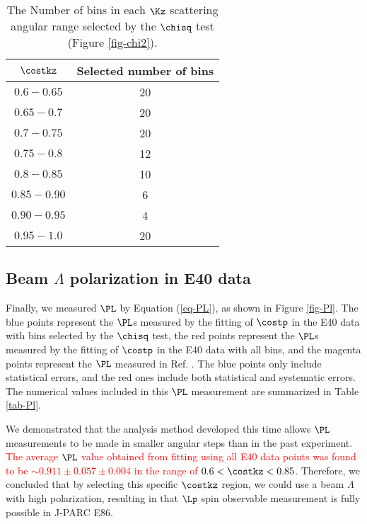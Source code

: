 \begin{table}[!h] 
  \begin{center}
  \caption{The Number of bins in each $\Kz$ scattering angular range selected by the $\chisq$ test (Figure \ref{fig-chi2}).}
  \centering
  \begin{threeparttable}
    \begin{tabular}{cc}
    $\costkz$ & Selected number of bins \\
    \midrule\midrule
    $0.6-0.65$ & 20 \\
    \midrule
    $0.65-0.7$ & 20 \\
    \midrule
    $0.7-0.75$ & 20 \\
    \midrule
    $0.75-0.8$ & 12 \\
    \midrule
    $0.8-0.85$ & 10 \\
    \midrule
    $0.85-0.90$ & 6 \\
    \midrule
    $0.90-0.95$ & 4 \\
    \midrule
    $0.95-1.0$ & 20 \\
    \end{tabular}
  \end{threeparttable}
  \label{tab-selebin}
  \end{center}
\end{table}
  

\clearpage
\subsection{Beam $\Lambda$ polarization in E40 data}

Finally, we measured $\PL$ by Equation (\ref{eq-PL}), as shown in Figure \ref{fig-Pl}. 
The blue points represent the $\PL$s measured by the fitting of $\costp$ in the E40 data with bins selected by the $\chisq$ test, the red points represent the $\PL$s measured by the fitting of $\costp$ in the E40 data with all bins, and the magenta points represent the $\PL$ measured in Ref. \cite{Baker}. The blue points only include statistical errors, and the red ones include both statistical and systematic errors. The numerical values included in this $\PL$ measurement are summarized in Table \ref{tab-Pl}.

We demonstrated that the analysis method developed this time allows $\PL$ measurements to be made in smaller angular steps than in the past experiment. \textcolor{red}{ The average $\PL$ value obtained from fitting using all E40 data points was found to be $\sim0.911\pm0.057\pm0.004$ in the range of $0.6<\costkz<0.85$. } Therefore, we concluded that by selecting this specific $\costkz$ region, we could use a beam $\Lambda$ with high polarization, resulting in that $\Lp$ spin observable measurement is fully possible in J-PARC E86.

